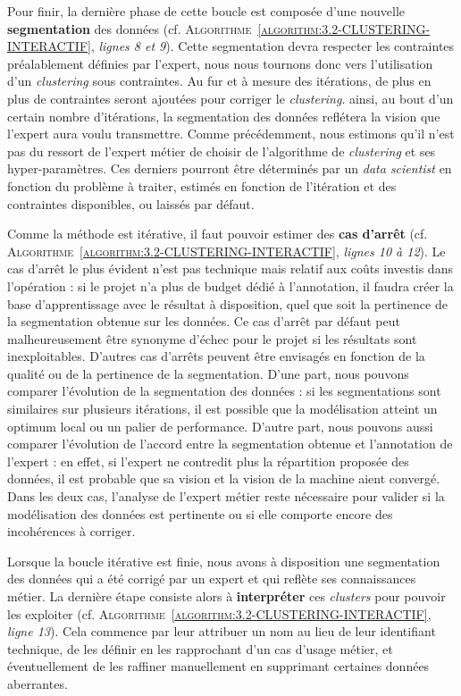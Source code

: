 		Pour finir, la dernière phase de cette boucle est composée d'une nouvelle \textbf{segmentation} des données (cf. \textsc{Algorithme~\ref{algorithm:3.2-CLUSTERING-INTERACTIF}}, \textit{lignes 8 et 9}).
		Cette segmentation devra respecter les contraintes préalablement définies par l'expert, nous nous tournons donc vers l'utilisation d'un \textit{clustering} sous contraintes.
		Au fur et à mesure des itérations, de plus en plus de contraintes seront ajoutées pour corriger le \textit{clustering}. ainsi, au bout d'un certain nombre d'itérations, la segmentation des données reflétera la vision que l'expert aura voulu transmettre.
		Comme précédemment, nous estimons qu'il n'est pas du ressort de l'expert métier de choisir de l'algorithme de \textit{clustering} et ses hyper-paramètres.
		Ces derniers pourront être déterminés par un \textit{data scientist} en fonction du problème à traiter, estimés en fonction de l'itération et des contraintes disponibles, ou laissés par défaut.
		
		Comme la méthode est itérative, il faut pouvoir estimer des \textbf{cas d'arrêt} (cf. \textsc{Algorithme~\ref{algorithm:3.2-CLUSTERING-INTERACTIF}}, \textit{lignes 10 à 12}).
		Le cas d'arrêt le plus évident n'est pas technique mais relatif aux coûts investis dans l'opération : si le projet n'a plus de budget dédié à l'annotation, il faudra créer la base d'apprentissage avec le résultat à disposition, quel que soit la pertinence de la segmentation obtenue sur les données.
		Ce cas d'arrêt par défaut peut malheureusement être synonyme d'échec pour le projet si les résultats sont inexploitables.
		D'autres cas d'arrêts peuvent être envisagés en fonction de la qualité ou de la pertinence de la segmentation.
		D'une part, nous pouvons comparer l'évolution de la segmentation des données : si les segmentations sont similaires sur plusieurs itérations, il est possible que la modélisation atteint un optimum local ou un palier de performance.
		D'autre part, nous pouvons aussi comparer l'évolution de l'accord entre la segmentation obtenue et l'annotation de l'expert : en effet, si l'expert ne contredit plus la répartition proposée des données, il est probable que sa vision et la vision de la machine aient convergé.
		Dans les deux cas, l'analyse de l'expert métier reste nécessaire pour valider si la modélisation des données est pertinente ou si elle comporte encore des incohérences à corriger.

		Lorsque la boucle itérative est finie, nous avons à disposition une segmentation des données qui a été corrigé par un expert et qui reflète ses connaissances métier.
		La dernière étape consiste alors à \textbf{interpréter} ces \textit{clusters} pour pouvoir les exploiter (cf. \textsc{Algorithme~\ref{algorithm:3.2-CLUSTERING-INTERACTIF}}, \textit{ligne 13}).
		Cela commence par leur attribuer un nom au lieu de leur identifiant technique, de les définir en les rapprochant d'un cas d'usage métier, et éventuellement de les raffiner manuellement en supprimant certaines données aberrantes.
		
